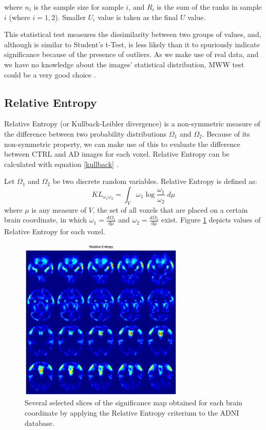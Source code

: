 \noindent where $n_i$ is the sample size for sample $i$, and $R_i$ is the sum of the ranks in sample $i$ (where $i=1,2$). Smaller $U_i$ value is taken as the final $U$ value. 

This statistical test measures the dissimilarity between two groups of values, and, although is similar to Student's t-Test, is less likely than it to spuriously indicate significance because of the presence of outliers. As we make use of real data, and we have no knowledge about the images' statistical distribution, MWW test could be a very good choice \cite{Fay10}.


\subsection{Relative Entropy} 
Relative Entropy (or Kullback-Leibler divergence) is a non-symmetric measure of the difference between two probability distributions $\Omega_1$ and $\Omega_2$. Because of its non-symmetric property, we can make use of this to evaluate the difference between CTRL and AD images for each voxel. Relative Entropy can be calculated with equation \ref{kullback} \cite{EntropyBishop}. 

Let $\Omega_1$ and $\Omega_2$ be two discrete random variables. Relative Entropy is defined as:
\begin{equation}\label{kullback}
KL_{\omega_1 \omega_2} =  \int_{V} \omega_1 \log \frac{\omega_1}{\omega_2} \;d\mu
\end{equation}
\noindent where $\mu$ is any measure of $V$, the set of all voxels that are placed on a certain brain coordinate, in which $\omega_1 = \frac{d \Omega_1}{d \mu}$ and $\omega_2 = \frac{d \Omega_2}{d \mu}$ exist. Figure \ref{fig:Zentropy} depicts values of Relative Entropy for each voxel. 

\begin{figure}
	\centering
	\includegraphics[width=0.7\textwidth]{gfx/ch5/Zentropy.eps}
	\caption{Several selected slices of the significance map obtained for each brain coordinate by applying the Relative Entropy criterium to the ADNI database.}
	\label{fig:Zentropy}
\end{figure}
